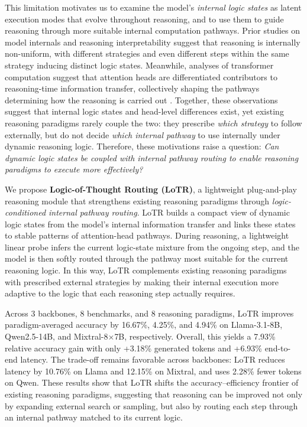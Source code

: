 This limitation motivates us to examine the model's \emph{internal logic states} as latent execution modes that evolve throughout reasoning, and to use them to guide reasoning through more suitable internal computation pathways.
Prior studies on model internals \citep{zou2023representationengineering} and reasoning interpretability \citep{zhang2025reasoningmodels} suggest that reasoning is internally non-uniform, with different strategies \citep{hao2024coconut,he2026beyondcot} and even different steps within the same strategy \citep{sun2026trajectories} inducing distinct logic states.
Meanwhile, analyses of transformer computation suggest that attention heads are differentiated contributors to reasoning-time information transfer, collectively shaping the pathways determining how the reasoning is carried out \citep{michel2019sixteen,olsson2022induction,voita2019analyzing}. 
Together, these observations suggest that internal logic states and head-level differences exist, yet existing reasoning paradigms rarely couple the two: they prescribe \emph{which strategy} to follow externally, but do not decide \emph{which internal pathway} to use internally under dynamic reasoning logic.
Therefore, these motivations raise a question: \emph{Can dynamic logic states be coupled with internal pathway routing to enable reasoning paradigms to execute more effectively?}

We propose \textbf{Logic-of-Thought Routing (LoTR)}, a lightweight plug-and-play reasoning module that strengthens existing reasoning paradigms through \emph{logic-conditioned internal pathway routing}.
LoTR builds a compact view of dynamic logic states from the model's internal information transfer and links these states to stable patterns of attention-head pathways. 
During reasoning, a lightweight linear probe infers the current logic-state mixture from the ongoing step, and the model is then softly routed through the pathway most suitable for the current reasoning logic. 
In this way, LoTR complements existing reasoning paradigms with prescribed external strategies by making their internal execution more adaptive to the logic that each reasoning step actually requires.

Across 3 backbones, 8 benchmarks, and 8 reasoning paradigms, LoTR improves paradigm-averaged accuracy by 16.67\%, 4.25\%, and 4.94\% on Llama-3.1-8B, Qwen2.5-14B, and Mixtral-8$\times$7B, respectively. 
Overall, this yields a 7.93\% relative accuracy gain with only +3.18\% generated tokens and +6.93\% end-to-end latency. 
The trade-off remains favorable across backbones: LoTR reduces latency by 10.76\% on Llama and 12.15\% on Mixtral, and uses 2.28\% fewer tokens on Qwen. 
These results show that LoTR shifts the accuracy--efficiency frontier of existing reasoning paradigms, suggesting that reasoning can be improved not only by expanding external search or sampling, but also by routing each step through an internal pathway matched to its current logic.